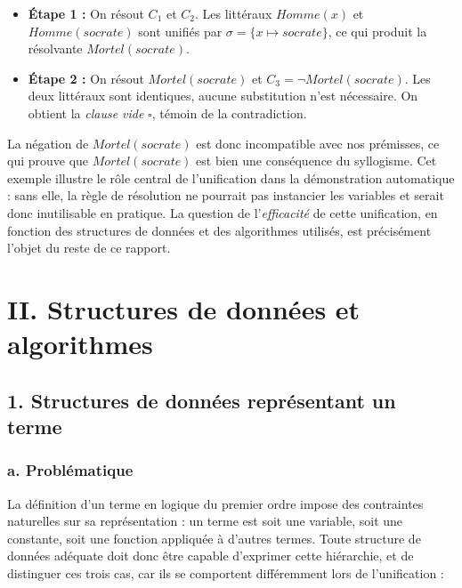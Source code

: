 \documentclass[11pt]{article}
\begin{document}
\begin{itemize}
    \item \textbf{Étape 1 :} On résout $C_1$ et $C_2$. Les littéraux 
    $\mathit{Homme}(x)$ et $\mathit{Homme}(\mathit{socrate})$ sont unifiés 
    par $\sigma = \{x \mapsto \mathit{socrate}\}$, ce qui produit la 
    résolvante $\mathit{Mortel}(\mathit{socrate})$.
    \item \textbf{Étape 2 :} On résout $\mathit{Mortel}(\mathit{socrate})$ 
    et $C_3 = \neg\mathit{Mortel}(\mathit{socrate})$. Les deux littéraux 
    sont identiques, aucune substitution n'est nécessaire. On obtient la 
    \textit{clause vide} $\square$, témoin de la contradiction.
\end{itemize}

\vspace{0.2cm}
La négation de $\mathit{Mortel}(\mathit{socrate})$ est donc incompatible avec nos prémisses, ce qui prouve que $\mathit{Mortel}(\mathit{socrate})$ est bien une conséquence du syllogisme. Cet exemple illustre le rôle central de l'unification dans la démonstration automatique : sans elle, la règle de résolution ne pourrait pas instancier les variables et serait donc inutilisable en pratique. La question de l'\textit{efficacité} de cette unification, en fonction des structures de données et des algorithmes utilisés, est précisément l'objet du reste de ce rapport.


\newpage
\section*{II. Structures de données et algorithmes}
\label{structures}

\subsection*{1. Structures de données représentant un terme}
\label{repr_terme}

\subsubsection*{\hspace{4em}a. Problématique}
\label{prob}
\vspace{0.2cm}

La définition d'un terme en logique du premier ordre impose des contraintes 
naturelles sur sa représentation : un terme est soit une variable, soit une 
constante, soit une fonction appliquée à d'autres termes. Toute structure de 
données adéquate doit donc être capable d'exprimer cette hiérarchie, et de 
distinguer ces trois cas, car ils se comportent différemment lors de 
l'unification :
\end{document}
